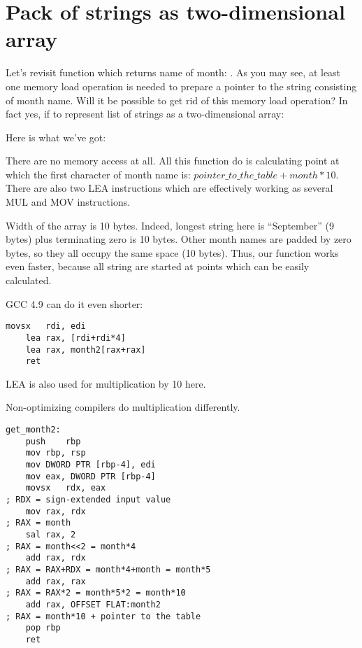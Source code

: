 \ifdefined\RUSSIAN
\else
\section{Pack of strings as two-dimensional array}

Let's revisit function which returns name of month: .
As you may see, at least one memory load operation is needed to prepare a pointer to the string
consisting of month name.
Will it be possible to get rid of this memory load operation?
In fact yes, if to represent list of strings as a two-dimensional array:



Here is what we've got:



There are no memory access at all. 
All this function do is calculating point at which the first character of month name is: 
$pointer\_to\_the\_table + month * 10$.
There are also two LEA instructions which are effectively working as several MUL and MOV instructions.

Width of the array is 10 bytes. 
Indeed, longest string here is ``September'' (9 bytes) plus terminating zero is 10 bytes.
Other month names are padded by zero bytes, so they all occupy the same space (10 bytes).
Thus, our function works even faster, because all string are started at points which can be easily
calculated.

GCC 4.9 can do it even shorter:

\begin{lstlisting}[caption=\Optimizing GCC 4.9 x64]
	movsx	rdi, edi
	lea	rax, [rdi+rdi*4]
	lea	rax, month2[rax+rax]
	ret
\end{lstlisting}

LEA is also used for multiplication by 10 here.

Non-optimizing compilers do multiplication differently.

\begin{lstlisting}[caption=\NonOptimizing GCC 4.9 x64]
get_month2:
	push	rbp
	mov	rbp, rsp
	mov	DWORD PTR [rbp-4], edi
	mov	eax, DWORD PTR [rbp-4]
	movsx	rdx, eax
; RDX = sign-extended input value
	mov	rax, rdx
; RAX = month
	sal	rax, 2
; RAX = month<<2 = month*4
	add	rax, rdx
; RAX = RAX+RDX = month*4+month = month*5
	add	rax, rax
; RAX = RAX*2 = month*5*2 = month*10
	add	rax, OFFSET FLAT:month2
; RAX = month*10 + pointer to the table
	pop	rbp
	ret
\end{lstlisting}

